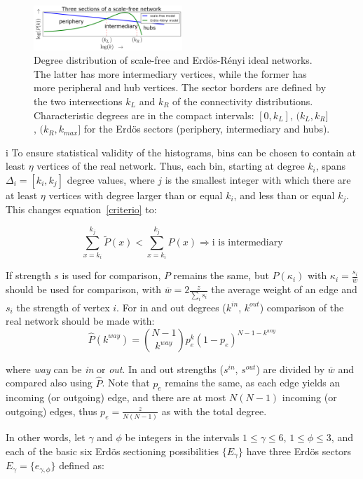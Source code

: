 \documentclass[%
	aip,
	jmp,%
	amsmath,amssymb,
	reprint,%
]{revtex4-1}
\begin{document}
\begin{figure}[!h]
	\centering
	\includegraphics[width=0.5\textwidth]{figs/fser_}
	\caption{Degree distribution of scale-free and Erd\"os-R\'enyi ideal networks.
		The latter has more intermediary vertices, while the former has more peripheral and hub vertices.
		The sector borders are defined by the two intersections $k_L$ and $k_R$ of the connectivity distributions.
		Characteristic degrees are in the compact intervals: $[0,k_L]$, $(k_L,k_R]$, $(k_R,k_{max}]$ for the Erd\"os sectors (periphery, intermediary and hubs).}
		\label{fig:setores}
\end{figure}
i	To ensure statistical validity of the histograms, bins can be chosen to contain at least $\eta$ vertices of the real network. Thus, each bin, starting at degree $k_i$, spans $\Delta_i=[k_{i},k_{j}]$ degree values, where $j$ is the smallest integer with which there are at least $\eta$ vertices with degree larger than or equal $k_i$, and less than or equal $k_{j}$. This changes equation~\ref{criterio} to:

\begin{equation}\label{criterio2}
	\sum_{x=k_i}^{k_j} \widetilde{P}(x) < \sum_{x=k_i}^{k_j} P(x) \Rightarrow \text{i is intermediary}
\end{equation}

If strength $s$ is used for comparison, $P$ remains the same, but $P(\kappa_i)$ with $\kappa_i=\frac{s_i}{\overline{w}}$ should be used for comparison, with $\overline{w}=2\frac{z}{\sum_is_i}$ the average weight of an edge and $s_i$ the strength of vertex $i$. For in and out degrees ($k^{in}$, $k^{out}$) comparison of the real network should be made with:
\begin{equation}
	\hat{P}(k^{way})=\binom{N-1}{k^{way}}p_e^k(1-p_e)^{N-1-k^{way}}
\end{equation}

\noindent where \emph{way} can be \emph{in} or \emph{out}. In and out strengths ($s^{in}$, $s^{out}$) are divided by $\overline{w}$ and compared also using $\hat{P}$. Note that $p_e$ remains the same, as each edge yields an incoming (or outgoing) edge, and there are at most $N(N-1)$ incoming (or outgoing) edges, thus $p_e=\frac{z}{N(N-1)}$ as with the total degree.

In other words, let $\gamma$ and $\phi$ be integers in the intervals $1 \leq \gamma \leq 6$, $1 \leq \phi \leq 3$, and each of the basic six Erd\"os sectioning possibilities $\{E_{\gamma}\}$ have three Erd\"os sectors $E_{\gamma}= \{e_{\gamma, \phi} \}$ defined as:
\end{document}
